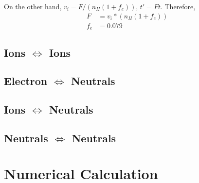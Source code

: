 \documentclass{article}
\begin{document}
On the other hand, $v_i = F/(n_H(1+f_e))$, $t'=Ft$. Therefore,
\begin{equation}\
	\begin{split}
		F &= v_i * (n_H(1+f_e))\\
		f_e &= 0.079
	\end{split}
\end{equation}

\subsection{Ions $\Longleftrightarrow$ Ions}

\subsection{Electron $\Longleftrightarrow$ Neutrals}

\subsection{Ions $\Longleftrightarrow$ Neutrals}

\subsection{Neutrals $\Longleftrightarrow$ Neutrals}
\section{Numerical Calculation}

\label{section_model_comparision}
\end{document}

